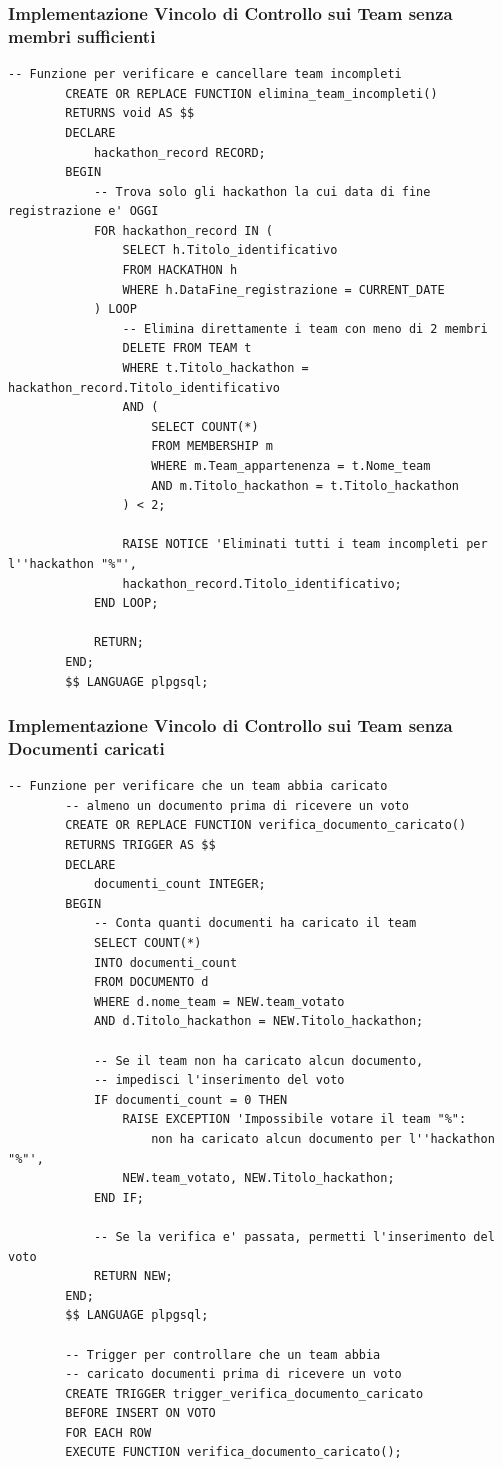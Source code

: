 \documentclass[a4paper, 10pt]{article}
\begin{document}
	\subsubsection{Implementazione Vincolo di Controllo sui Team senza membri sufficienti}
	\begin{lstlisting}[style=sqlstyle]
		-- Funzione per verificare e cancellare team incompleti
		CREATE OR REPLACE FUNCTION elimina_team_incompleti()
		RETURNS void AS $$
		DECLARE
			hackathon_record RECORD;
		BEGIN
			-- Trova solo gli hackathon la cui data di fine registrazione e' OGGI
			FOR hackathon_record IN (
				SELECT h.Titolo_identificativo 
				FROM HACKATHON h 
				WHERE h.DataFine_registrazione = CURRENT_DATE
			) LOOP
				-- Elimina direttamente i team con meno di 2 membri
				DELETE FROM TEAM t
				WHERE t.Titolo_hackathon = hackathon_record.Titolo_identificativo
				AND (
					SELECT COUNT(*) 
					FROM MEMBERSHIP m 
					WHERE m.Team_appartenenza = t.Nome_team 
					AND m.Titolo_hackathon = t.Titolo_hackathon
				) < 2;
				
				RAISE NOTICE 'Eliminati tutti i team incompleti per l''hackathon "%"', 
				hackathon_record.Titolo_identificativo;
			END LOOP;
			
			RETURN;
		END;
		$$ LANGUAGE plpgsql;
	\end{lstlisting}
	\subsubsection{Implementazione Vincolo di Controllo sui Team senza Documenti caricati}
	\begin{lstlisting}[style=sqlstyle]
		-- Funzione per verificare che un team abbia caricato 
		-- almeno un documento prima di ricevere un voto
		CREATE OR REPLACE FUNCTION verifica_documento_caricato()
		RETURNS TRIGGER AS $$
		DECLARE
			documenti_count INTEGER;
		BEGIN
			-- Conta quanti documenti ha caricato il team
			SELECT COUNT(*)
			INTO documenti_count
			FROM DOCUMENTO d
			WHERE d.nome_team = NEW.team_votato
			AND d.Titolo_hackathon = NEW.Titolo_hackathon;
			
			-- Se il team non ha caricato alcun documento, 
			-- impedisci l'inserimento del voto
			IF documenti_count = 0 THEN
				RAISE EXCEPTION 'Impossibile votare il team "%": 
					non ha caricato alcun documento per l''hackathon "%"',
				NEW.team_votato, NEW.Titolo_hackathon;
			END IF;
			
			-- Se la verifica e' passata, permetti l'inserimento del voto
			RETURN NEW;
		END;
		$$ LANGUAGE plpgsql;
		
		-- Trigger per controllare che un team abbia 
		-- caricato documenti prima di ricevere un voto
		CREATE TRIGGER trigger_verifica_documento_caricato
		BEFORE INSERT ON VOTO
		FOR EACH ROW
		EXECUTE FUNCTION verifica_documento_caricato();
	\end{lstlisting}
\end{document}

